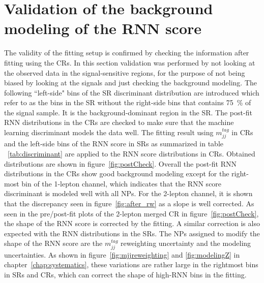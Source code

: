 \section{Validation of the background modeling of the RNN score}
\label{sec:confirm}
The validity of the fitting setup is confirmed by checking the information after fitting using the CRs.
In this section validation was performed by not looking at the observed data in the signal-sensitive regions, for the purpose of not being biased by looking at the signals and just checking the background modeling.
The following ``left-side" bins of the SR discriminant distribution are introduced which refer to as the bins in the SR without the right-side bins that contains 75~\% of the signal sample. It is the background-dominant region in the SR.
The post-fit RNN distributions in the CRs are checked to make sure that the machine learning discriminant models the data well.
The fitting result using $m^{tag}_{jj}$ in CRs and the left-side bins of the RNN score in SRs as summarized in table ~\ref{tab:discriminant} are applied to the RNN score distributions in CRs. 
Obtained distributions are shown in figure~\ref{fig:postCheck}. 
Overall the post-fit RNN distributions in the CRs show good background modeling except for the right-most bin of the 1-lepton channel, which indicates that the RNN score discriminant is modeled well with all NPs. For the 2-lepton channel, it is shown that the discrepancy seen in figure~\ref{fig:after_rw} as a slope is well corrected.
As seen in the pre/post-fit plots of the 2-lepton merged CR in figure~\ref{fig:postCheck}, the shape of the RNN score is corrected by the fitting.
A similar correction is also expected with the RNN distributions in the SRs.
The NPs assigned to modify the shape of the RNN score are the $m^{tag}_{jj}$ reweighting uncertainty and the modeling uncertainties.
As shown in figure~\ref{fig:mjjreweighting} and \ref{fig:modelingZ} in chapter~\ref{chap:systematics}, these variations are rather large in the rightmost bins in SRs and CRs, which can correct the shape of high-RNN bins in the fitting.
